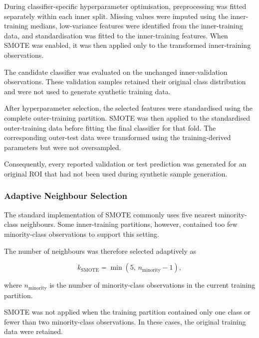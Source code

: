 \documentclass[12pt,twocolumn]{article}
\begin{document}
During classifier-specific hyperparameter optimisation, preprocessing
was fitted separately within each inner split. Missing values were
imputed using the inner-training medians, low-variance features were
identified from the inner-training data, and standardisation was fitted
to the inner-training features. When SMOTE was enabled, it was then
applied only to the transformed inner-training observations.

The candidate classifier was evaluated on the unchanged
inner-validation observations. These validation samples retained their
original class distribution and were not used to generate synthetic
training data.

After hyperparameter selection, the selected features were
standardised using the complete outer-training partition. SMOTE was
then applied to the standardised outer-training data before fitting the
final classifier for that fold. The corresponding outer-test data were
transformed using the training-derived parameters but were not
oversampled.

Consequently, every reported validation or test prediction was
generated for an original ROI that had not been used during synthetic
sample generation.






\subsubsection{Adaptive Neighbour Selection}
\label{subsubsec:adaptive_smote}

The standard implementation of SMOTE commonly uses five nearest
minority-class neighbours. Some inner-training partitions, however,
contained too few minority-class observations to support this setting.

The number of neighbours was therefore selected adaptively as

\begin{equation}
k_{\mathrm{SMOTE}}
=
\min
\left(
5,\,
n_{\mathrm{minority}}-1
\right),
\label{eq:adaptive_smote_neighbours}
\end{equation}

where \(n_{\mathrm{minority}}\) is the number of minority-class
observations in the current training partition.

SMOTE was not applied when the training partition contained only one
class or fewer than two minority-class observations. In these cases,
the original training data were retained.
\end{document}

